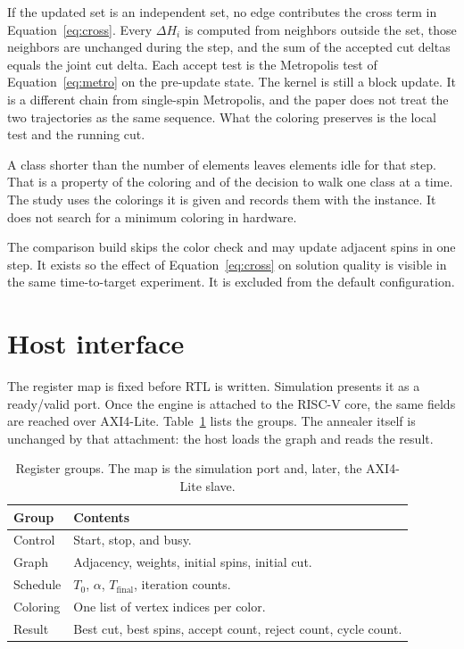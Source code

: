 \documentclass[10pt,twocolumn]{article}
\begin{document}
If the updated set is an independent set, no edge contributes the cross term in Equation~\eqref{eq:cross}.
Every \(\Delta H_i\) is computed from neighbors outside the set, those neighbors are unchanged during the step, and the sum of the accepted cut deltas equals the joint cut delta.
Each accept test is the Metropolis test of Equation~\eqref{eq:metro} on the pre-update state.
The kernel is still a block update.
It is a different chain from single-spin Metropolis, and the paper does not treat the two trajectories as the same sequence.
What the coloring preserves is the local test and the running cut.

A class shorter than the number of elements leaves elements idle for that step.
That is a property of the coloring and of the decision to walk one class at a time.
The study uses the colorings it is given and records them with the instance.
It does not search for a minimum coloring in hardware.

The comparison build skips the color check and may update adjacent spins in one step.
It exists so the effect of Equation~\eqref{eq:cross} on solution quality is visible in the same time-to-target experiment.
It is excluded from the default configuration.

\section{Host interface}

The register map is fixed before RTL is written.
Simulation presents it as a ready/valid port.
Once the engine is attached to the RISC-V core, the same fields are reached over AXI4-Lite.
Table~\ref{tab:map} lists the groups.
The annealer itself is unchanged by that attachment: the host loads the graph and reads the result.

\begin{table}[t]
\caption{Register groups.
The map is the simulation port and, later, the AXI4-Lite slave.}
\label{tab:map}
\centering
\small
\begin{tabular}{@{}l>{\raggedright\arraybackslash}p{}@{}}
\toprule
Group & Contents \\
\midrule
Control & Start, stop, and busy. \\
Graph & Adjacency, weights, initial spins, initial cut. \\
Schedule & \(T_0\), \(\alpha\), \(T_{\mathrm{final}}\), iteration counts. \\
Coloring & One list of vertex indices per color. \\
Result & Best cut, best spins, accept count, reject count, cycle count. \\
\bottomrule
\end{tabular}
\end{table}
\end{document}
